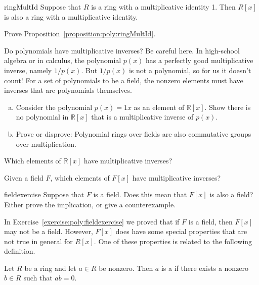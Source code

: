 \begin{prop}{ringMultId}
Suppose that $R$ is a ring with a multiplicative identity 1. Then $R[x]$ is also a ring with a multiplicative identity.
\end{prop}

\begin{exercise}{}
Prove Proposition~\ref{proposition:poly:ringMultId}.
\end{exercise}

Do polynomials have multiplicative inverses? Be careful here. In high-school algebra or in calculus,   the polynomial $p(x)$ has a perfectly good multiplicative inverse, namely  $1/p(x)$. But $1/p(x)$ is not a polynomial, so for us it doesn't count! For a set of polynomials to be a field, the nonzero elements must have inverses that are polynomials themselves.

\begin{exercise}{}
\begin{enumerate}[(a)]
\item
Consider the  polynomial $p(x)= 1x$ as an element of $\mathbb{R}[x]$. Show there is no polynomial in $\mathbb{R}[x]$ that is a multiplicative inverse of $p(x)$.
\item
Prove or disprove: Polynomial rings over fields are also commutative groups over multiplication.
\end{enumerate}
\end{exercise}

\begin{exercise}{}
Which elements of $\mathbb{R}[x]$ have multiplicative inverses?
\end{exercise}


\begin{exercise}{}
Given a field $F$, which elements of $F[x]$ have multiplicative inverses?
\end{exercise}

\begin{exercise}{fieldexercise}
Suppose that $F$ is a field. Does this mean that $F[x]$ is also a field? Either prove the implication, or give a counterexample.
\end{exercise}


In Exercise~\ref{exercise:poly:fieldexercise} we proved that if $F$ is a field, then $F[x]$  may not be a field. However, $F[x]$ does have some special properties that are not true in general for $R[x]$. 
One of these properties is related to the following definition. 

\begin{defn}
Let $R$ be a ring and let $a\in R$ be nonzero. Then $a$ is a  if there exists a nonzero $b \in R$ such that $ab=0$.
\end{defn}

